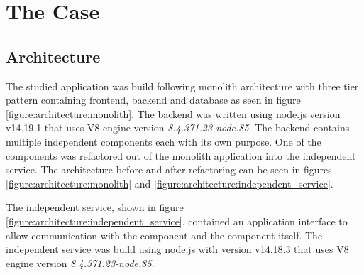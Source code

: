 \chapter{The Case\label{case}}

\section{Architecture}
The studied application was build following monolith architecture with three tier pattern containing frontend, backend and database as seen in figure \ref{figure:architecture:monolith}.
The backend was written using node.js version v14.19.1 that uses V8 engine version \textit{8.4.371.23-node.85}.
The backend contains multiple independent components each with its own purpose.
One of the components was refactored out of the monolith application into the independent service.
The architecture before and after refactoring can be seen in figures \ref{figure:architecture:monolith} and \ref{figure:architecture:independent_service}.

The independent service, shown in figure \ref{figure:architecture:independent_service}, contained an application interface to allow communication with the component and the component itself.
The independent service was build using node.js with version v14.18.3 that uses V8 engine version \textit{8.4.371.23-node.85}.


